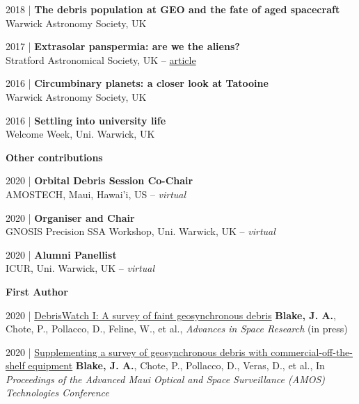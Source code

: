 \documentclass[10pt,a4paper]{altacv}
\begin{document}
\small 2018 | \textbf{The debris population at GEO and the fate of aged spacecraft} \\
Warwick Astronomy Society, UK

\smallskip

\small 2017 | \textbf{Extrasolar panspermia: are we the aliens?} \\
Stratford Astronomical Society, UK -- \href{http://www.astro.org.uk/news/nov17/}{article}

\smallskip

\small 2016 | \textbf{Circumbinary planets: a closer look at Tatooine} \\
Warwick Astronomy Society, UK

\smallskip

\small 2016 | \textbf{Settling into university life} \\
Welcome Week, Uni. Warwick, UK

\divider

\normalsize \textbf{Other contributions}

\medskip

\small 2020 | \textbf{Orbital Debris Session Co-Chair} \\
AMOSTECH, Maui, Hawai'i, US -- \textit{virtual}

\smallskip

\small 2020 | \textbf{Organiser and Chair} \\
GNOSIS Precision SSA Workshop, Uni. Warwick, UK -- \textit{virtual}

\smallskip

\small 2020 | \textbf{Alumni Panellist} \\
ICUR, Uni. Warwick, UK -- \textit{virtual}

\medskip


\normalsize \textbf{First Author} 

\medskip

\small
2020 | \href{https://www.sciencedirect.com/science/article/abs/pii/S0273117720305664}{DebrisWatch I: A survey of faint geosynchronous debris}
\textbf{Blake, J. A.}, Chote, P., Pollacco, D., Feline, W., et al., \textit{Advances in Space Research} (in press)

\smallskip

\small
2020 | \href{https://www.researchgate.net/publication/344329639_Supplementing_a_survey_of_geosynchronous_debris_with_commercial-off-the-shelf_equipment}{Supplementing a survey of geosynchronous debris with commercial-off-the-shelf equipment}
\textbf{Blake, J. A.}, Chote, P., Pollacco, D., Veras, D., et al., In \textit{Proceedings of the Advanced Maui Optical and Space Surveillance (AMOS) Technologies Conference}
\end{document}
